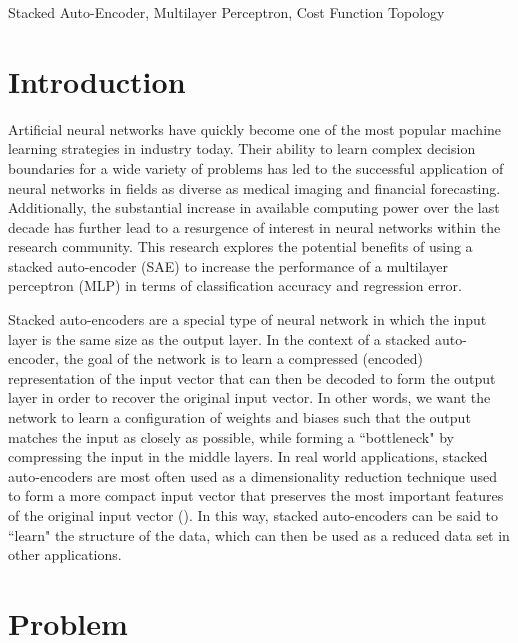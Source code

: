 \documentclass[twoside,11pt]{article}
\begin{document}
\begin{keywords}
  Stacked Auto-Encoder, Multilayer Perceptron, Cost Function Topology
\end{keywords}

\section{Introduction}

Artificial neural networks have quickly become one of the most popular machine learning strategies in industry today. Their ability to learn complex decision boundaries for a wide variety of problems has led to the successful application of neural networks in fields as diverse as medical imaging and financial forecasting. Additionally, the substantial increase in available computing power over the last decade has further lead to a resurgence of interest in neural networks within the research community. This research explores the potential benefits of using a stacked auto-encoder (SAE) to increase the performance of a multilayer perceptron (MLP) in terms of classification accuracy and regression error.

Stacked auto-encoders are a special type of neural network in which the input layer is the same size as the output layer. In the context of a stacked auto-encoder, the goal of the network is to learn a compressed (encoded) representation of the input vector that can then be decoded to form the output layer in order to recover the original input vector. In other words, we want the network to learn a configuration of weights and biases such that the output matches the input as closely as possible, while forming a ``bottleneck" by compressing the input in the middle layers. In real world applications, stacked auto-encoders are most often used as a dimensionality reduction technique used to form a more compact input vector that preserves the most important features of the original input vector (\cite{vincent2010stacked}). In this way, stacked auto-encoders can be said to ``learn" the structure of the data, which can then be used as a reduced data set in other applications.

\section{Problem}
\end{document}
